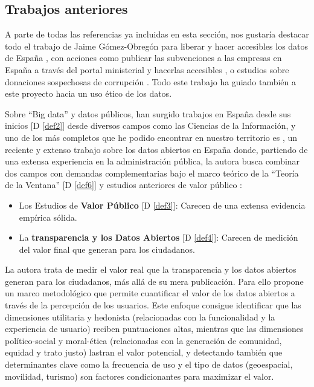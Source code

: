 \subsection{Trabajos anteriores}
	
	A parte de todas las referencias ya incluidas en esta sección, nos gustaría destacar todo el trabajo de Jaime Gómez-Obregón para liberar y hacer accesibles los datos de España \citep{JaimeGomezObregon}, con acciones como publicar las subvenciones a las empresas en España a través del portal ministerial y hacerlas accesibles  \citep{JaimeGomezObregonSubvenciones}, o estudios sobre donaciones sospechosas de corrupción \citep{JaimeGomezObregonDonacion}. Todo este trabajo ha guiado también a este proyecto hacia un uso ético de los datos.
	
	Sobre ``Big data'' y datos públicos, han surgido trabajos en España desde sus inicios \citep{OperGovernment2011} [D \ref{def2}] desde diversos campos como las Ciencias de la Información, y uno de los más completos que he podido encontrar en nuestro territorio es \citep{HerreraCapriz2024}, un reciente y extenso trabajo sobre los datos abiertos en España donde, partiendo de una extensa experiencia en la administración pública, la autora busca combinar dos campos con demandas complementarias bajo el marco teórico de la ``Teoría de la Ventana'' [D \ref{def6}] y estudios anteriores de valor público \citep{Meynhardt19032009}:
	\begin{itemize}
		\item Los Estudios de \textbf{Valor Público} [D \ref{def3}]: Carecen de una extensa evidencia empírica sólida.
		\item La \textbf{transparencia y los Datos Abiertos} [D \ref{def4}]: Carecen de medición del valor final que generan para los ciudadanos.
	\end{itemize}
	
	La autora trata de medir el valor real que la transparencia y los datos abiertos generan para los ciudadanos, más allá de su mera publicación. Para ello propone un marco metodológico que permite cuantificar el valor de los datos abiertos a través de la percepción de los usuarios. Este enfoque consigue identificar que las dimensiones utilitaria y hedonista (relacionadas con la funcionalidad y la experiencia de usuario) reciben puntuaciones altas, mientras que las dimensiones político-social y moral-ética (relacionadas con la generación de comunidad, equidad y trato justo) lastran el valor potencial, y detectando también que determinantes clave como la frecuencia de uso y el tipo de datos (geoespacial, movilidad, turismo) son factores condicionantes para maximizar el valor.
	
